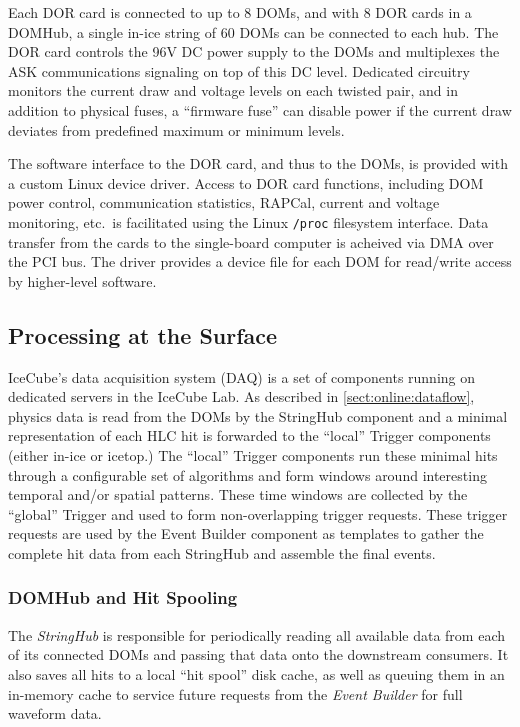 Each DOR card is connected to up to 8 DOMs, and with 8 DOR cards in a
DOMHub, a single in-ice string of 60 DOMs can be connected to each hub. The
DOR card controls the 96V DC power supply to the DOMs and multiplexes the
ASK communications signaling on top of this DC level.  Dedicated circuitry
monitors the current draw and voltage levels on each twisted pair, and in
addition to physical fuses, a ``firmware fuse'' can disable power if the
current draw deviates from predefined maximum or minimum levels.

The software interface to the DOR card, and thus to the DOMs, is provided
with a custom Linux device driver.  Access to DOR card functions,
including DOM power control, communication statistics, RAPCal, current and
voltage monitoring, etc.~is facilitated using the Linux \texttt{/proc}
filesystem interface.  Data transfer from the cards to the single-board
computer is acheived via DMA over the PCI bus.  The driver provides a
device file for each DOM for read/write access by higher-level software.

\subsection{Processing at the Surface}

IceCube's data acquisition system (DAQ) is a set of components running on
dedicated servers in the IceCube Lab.  As described in \ref{sect:online:dataflow}, physics data is read from the DOMs by the StringHub
component and a minimal representation of each HLC hit is forwarded to the
``local'' Trigger components (either in-ice or icetop.)
The ``local'' Trigger components run these
minimal hits through a configurable set of algorithms and form windows around
interesting temporal and/or spatial patterns.  These time windows are collected
by the ``global'' Trigger and used to form non-overlapping trigger requests.
These trigger requests are used by the Event Builder component as templates to
gather the complete hit data from each StringHub and assemble the final events.

\subsubsection{DOMHub and Hit Spooling}
\label{sec:domhub_hitspool}

The \emph{StringHub} is responsible for periodically reading all available data
from each of its connected DOMs and passing that data onto the downstream
consumers.  It also saves all hits to a local ``hit spool'' disk cache, as
well as queuing them in an in-memory cache to service future requests from
the \emph{Event Builder} for full waveform data.

